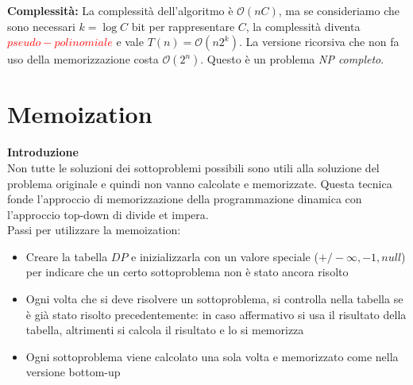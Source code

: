 \documentclass[../cheatSheetAlgoritmi.tex]{subfiles}
\begin{document}
\textbf{Complessità:} La complessità dell'algoritmo è $\mathcal{O}(nC)$, ma se consideriamo che sono necessari $k = \log C$ bit per rappresentare $C$, la complessità diventa \textcolor{red}{$pseudo-polinomiale$} e vale $T(n) = \mathcal{O}(n2^{k})$.
La versione ricorsiva che non fa uso della memorizzazione costa $\mathcal{O}(2^{n})$. Questo è un problema \emph{NP completo}.

\section{Memoization}
\textbf{Introduzione}\\
Non tutte le soluzioni dei sottoproblemi possibili sono utili alla soluzione del problema originale e quindi non vanno calcolate e memorizzate. Questa tecnica fonde l'approccio di memorizzazione della programmazione dinamica con l'approccio top-down di divide et impera.\\
Passi per utilizzare la memoization:
\begin{itemize}
	\item Creare la tabella $DP$ e inizializzarla con un valore speciale ($+/- \infty, -1, null$) per indicare che un certo sottoproblema non è stato ancora risolto 
	\item Ogni volta che si deve risolvere un sottoproblema, si controlla nella tabella se è già stato risolto precedentemente: in caso affermativo si usa il risultato della tabella, altrimenti si calcola il risultato e lo si memorizza
	\item Ogni sottoproblema viene calcolato una sola volta e memorizzato come nella versione bottom-up
\end{itemize}
\newpage
\end{document}

